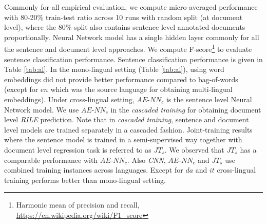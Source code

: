 \documentclass[11pt,a4paper]{article}
\begin{document}
Commonly for all empirical evaluation, we compute micro-averaged performance with 80-20\% train-test ratio across 10 runs with random split (at document level), where the 80\% split also contains sentence level annotated documents proportionally. Neural Network model has a single hidden layer commonly for all the sentence and document level approaches. We compute F-score\footnote{Harmonic mean of precision and recall, \url{https://en.wikipedia.org/wiki/F1_score}} to evaluate sentence classification performance. Sentence classification performance is given in Table \ref{tab:al}. In the mono-lingual setting (Table \ref{tab:al}), using word embeddings did not provide better performance compared to bag-of-words (except for $en$ which was the source language for obtaining multi-lingual embeddings). Under cross-lingual setting, $AE$-$NN_{c}$ is the sentence level Neural Network model. We use $AE$-$NN_{c}$ in the \textit{cascaded training} for obtaining document level \textit{RILE} prediction. Note that in \textit{cascaded training}, sentence and document level models are trained separately in a cascaded fashion. Joint-training results where the sentence model is trained in a semi-supervised way together with document level regression task is referred to as \textit{$JT_{s}$}.  We observed that $JT_{s}$ has a comparable performance with $AE$-$NN_{c}$. Also \textit{CNN}, $AE$-$NN_{c}$ and \textit{$JT_{s}$} use combined training instances across languages. Except for $da$ and $it$ cross-lingual training performs better than mono-lingual setting.
\end{document}

